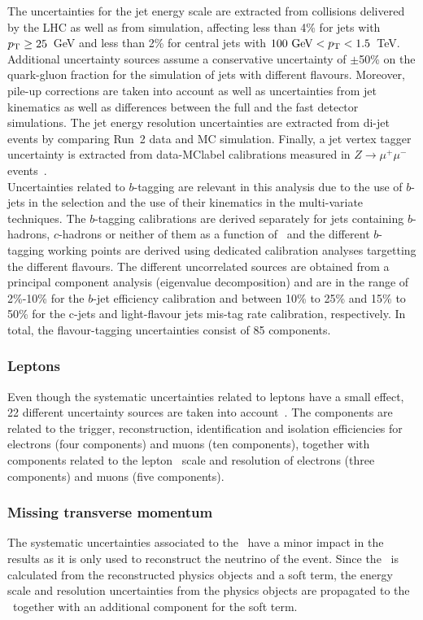 The uncertainties for the jet energy scale are extracted from collisions delivered by the LHC as well as from simulation, affecting less than 4\% for jets with $p_{\text{T}}\geq25$~GeV and less than 2\% for central jets with $100\text{ GeV}<p_{\text{T}}<1.5$~TeV. Additional uncertainty sources assume a conservative uncertainty of $\pm$50\% on the quark-gluon fraction for the simulation of jets with different flavours. Moreover, pile-up corrections are taken into account as well as uncertainties from jet kinematics as well as differences between the full and the fast detector simulations. The jet energy resolution uncertainties are extracted from di-jet events by comparing Run~2 data and MC simulation. Finally, a jet vertex tagger uncertainty is extracted from data-\acrshort{MClabel} calibrations measured in $Z\to\mu^+\mu^-$ events~\cite{Bothmann2016}.\\

Uncertainties related to $b$-tagging are relevant in this analysis due to the use of $b$-jets in the selection and the use of their kinematics in the multi-variate techniques. The $b$-tagging calibrations are derived separately for jets containing $b$-hadrons, $c$-hadrons or neither of them as a function of \pT\ and the different $b$-tagging working points are derived using dedicated calibration analyses targetting the different flavours. The different uncorrelated sources are obtained from a principal component analysis (eigenvalue decomposition) and are in the range of 2\%-10\% for the $b$-jet efficiency calibration and between 10\% to 25\% and
15\% to 50\% for the c-jets and light-flavour jets mis-tag rate calibration, respectively. In total, the flavour-tagging uncertainties consist of 85 components.\\

\subsubsection{Leptons}
Even though the systematic uncertainties related to leptons have a small effect, 22 different uncertainty sources are taken into account~\cite{performanceEgamma,performancemu}. The components are related to the trigger, reconstruction, identification and isolation efficiencies for electrons (four components) and muons (ten components), together with components related to the lepton \pT\ scale and resolution of electrons (three components) and muons (five components).

\subsubsection{Missing transverse momentum}
The systematic uncertainties associated to the \MET\ have a minor impact in the results as it is only used to reconstruct the neutrino of the event. Since the \MET\ is calculated from the reconstructed physics objects and a soft term, the energy scale and resolution uncertainties from the physics objects are propagated to the \MET\ together with an additional component for the soft term. 

